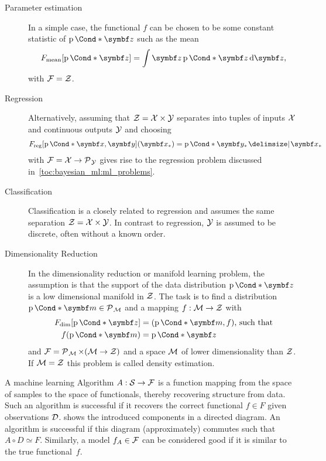 \begin{problem}
\begin{description}
    \item[Parameter estimation]
          In a simple case, the functional $f$ can be chosen to be some constant statistic of $\Prob*{\mat{z}}$ such as the mean
          \begin{align}
              F_{\text{mean}}[\Prob*{\mat{z}}] = \int \mat{z} \Prob*{\mat{z}} \diff \mat{z},
          \end{align}
          with $\mathcal{F} = \mathcal{Z}$.
    \item[Regression]
          Alternatively, assuming that $\mathcal{Z} = \mathcal{X} \times \mathcal{Y}$ separates into tuples of inputs $\mathcal{X}$ and continuous outputs $\mathcal{Y}$ and choosing
          \begin{align}
              F_{\text{reg}}[\Prob*{\mat{x}, \mat{y}}](\mat{x_\ast}) = \Prob*{\mat{y_\ast} \given \mat{x_\ast}}
          \end{align}
          with $\mathcal{F} = \mathcal{X} \to \operatorname{\mathcal{P}\mkern1mu}_{\mathcal{Y}}$ gives rise to the regression problem discussed in~\cref{toc:bayesian_ml:ml_problems}.
    \item[Classification]
          Classification is a closely related to regression and assumes the same separation $\mathcal{Z} = \mathcal{X} \times \mathcal{Y}$.
          In contrast to regression, $\mathcal{Y}$ is assumed to be discrete, often without a known order.
    \item[Dimensionality Reduction]
          In the dimensionality reduction or manifold learning problem, the assumption is that the support of the data distribution $\Prob*{\mat{z}}$ is a low dimensional manifold in $\mathcal{Z}$.
          The task is to find a distribution $\Prob*{\mat{m}} \in \Probs{\Mc}$ and a mapping $f : \mathcal{M} \to \mathcal{Z}$ with
          \begin{align}
              F_{\text{dim}}[\Prob*{\mat{z}}] & = (\Prob*{\mat{m}}, f)\text{, such that} \\
              f(\Prob*{\mat{m}})              & = \Prob*{\mat{z}}
          \end{align}
          and $\mathcal{F} = \operatorname{\mathcal{P}\mkern1mu}_{\mathcal{M}} \times (\mathcal{M} \to \mathcal{Z})$ and a space $\mathcal{M}$ of lower dimensionality than $\mathcal{Z}$.
          If $\mathcal{M} = \mathcal{Z}$ this problem is called density estimation.
\end{description}
\end{problem}

A machine learning Algorithm $A : \mathcal{S} \to \mathcal{F}$ is a function mapping from the space of samples to the space of functionals, thereby recovering structure from data.
Such an algorithm is successful if it recovers the correct functional $f \in F$ given observations $\mathcal{D}$.
 shows the introduced components in a directed diagram.
An algorithm is successful if this diagram (approximately) commutes such that $A \circ D \simeq F$.
Similarly, a model $f_A \in \mathcal{F}$ can be considered good if it is similar to the true functional~$f$.

